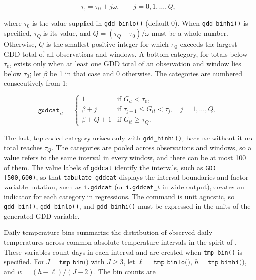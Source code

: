\begin{equation}
	\tau_j = \tau_0 + j \omega , \qquad j = 0, 1, \ldots, Q ,
\end{equation}

\noindent where $\tau_0$ is the value supplied in \texttt{gdd\_binlo()} (default 0). When \texttt{gdd\_binhi()} is specified, $\tau_Q$ is its value, and $Q = (\tau_Q - \tau_0)/\omega$ must be a whole number. Otherwise, $Q$ is the smallest positive integer for which $\tau_Q$ exceeds the largest GDD total of all observations and windows. A bottom category, for totals below $\tau_0$, exists only when at least one GDD total of an observation and window lies below $\tau_0$; let $\beta$ be 1 in that case and 0 otherwise. The categories are numbered consecutively from 1:

\begin{equation}
	\texttt{gddcat}_{it} =
	\begin{cases}
		1 & \text{if } G_{it} < \tau_0 , \\
		\beta + j & \text{if } \tau_{j-1} \leq G_{it} < \tau_j , \quad j = 1, \ldots, Q , \\
		\beta + Q + 1 & \text{if } G_{it} \geq \tau_Q .
	\end{cases}
\end{equation}

\noindent The last, top-coded category arises only with \texttt{gdd\_binhi()}, because without it no total reaches $\tau_Q$. The categories are pooled across observations and windows, so a value refers to the same interval in every window, and there can be at most 100 of them. The value labels of \texttt{gddcat} identify the intervals, such as \texttt{GDD [500,600)}, so that \texttt{tabulate gddcat} displays the interval boundaries and factor-variable notation, such as \texttt{i.gddcat} (or \texttt{i.gddcat\_}$t$ in wide output), creates an indicator for each category in regressions. The command is unit agnostic, so \texttt{gdd\_bin()}, \texttt{gdd\_binlo()}, and \texttt{gdd\_binhi()} must be expressed in the units of the generated GDD variable.

Daily temperature bins summarize the distribution of observed daily temperatures across common absolute temperature intervals in the spirit of \citet{SchlenkerRoberts09}. These variables count days in each interval and are created when \texttt{tmp\_bin()} is specified. For $J = \texttt{tmp\_bin()}$ with $J \geq 3$, let $\ell = \texttt{tmp\_binlo()}$, $h = \texttt{tmp\_binhi()}$, and $w = (h - \ell) / (J - 2)$. The bin counts are

